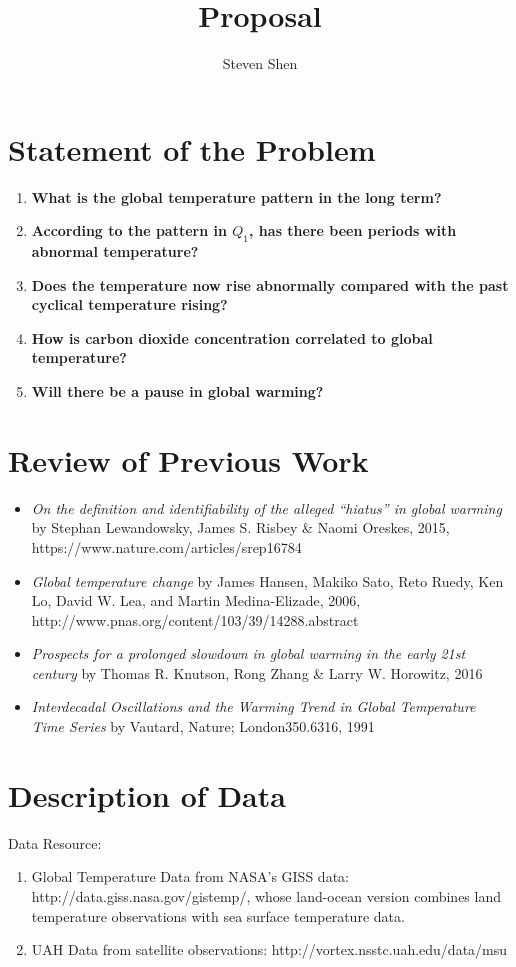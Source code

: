 \documentclass[11pt,a4paper]{paper}
\author{Steven Shen \quad \quad}
\title{Proposal}
\begin{document}
\maketitle

\section{Statement of the Problem}
\begin{enumerate}
	\item \textbf{What is the global temperature pattern in the long term?}
	\item \textbf{According to the pattern in $Q_1$, has there been periods with abnormal temperature?}
	\item \textbf{Does the temperature now rise abnormally compared with the past cyclical temperature rising?}  
	\item \textbf{How is carbon dioxide concentration correlated to global temperature?} 
	\item \textbf{Will there be a pause in global warming?} 
\end{enumerate}

\section{Review of Previous Work}
\begin{itemize}
	\item \textit{On the definition and identifiability of the alleged “hiatus” in global warming} by Stephan Lewandowsky, James S. Risbey \& Naomi Oreskes, 2015, https://www.nature.com/articles/srep16784 
	\item \textit{Global temperature change} by James Hansen, Makiko Sato, Reto Ruedy, Ken Lo, David W. Lea, and Martin Medina-Elizade, 2006, http://www.pnas.org/content/103/39/14288.abstract 
	\item \textit{Prospects for a prolonged slowdown in global warming in the early 21st century} by Thomas R. Knutson, Rong Zhang \& Larry W. Horowitz, 2016
	\item \textit{Interdecadal Oscillations and the Warming Trend in Global Temperature Time Series} by Vautard, Nature; London350.6316, 1991 
\end{itemize}


\section{Description of Data}
Data Resource:
\begin{enumerate}
	\item Global Temperature Data from NASA’s GISS data: http://data.giss.nasa.gov/gistemp/, whose land-ocean version combines land temperature observations with sea surface temperature data.

	\item UAH Data from satellite observations: http://vortex.nsstc.uah.edu/data/msu
 
\end{enumerate}
\end{document}
